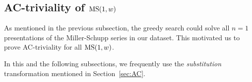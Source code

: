 \subsection{AC-triviality of $\text{MS}(1, w)$} \label{sec:ms1w_}

As mentioned in the previous subsection, the greedy search could solve all $n=1$ presentations of the Miller-Schupp series in our dataset. This motivated us to prove AC-triviality for all $\text{MS}(1, w)$. 

In this and the following subsections, we frequently use the \emph{substitution} transformation mentioned in Section~\ref{sec:AC}.   




